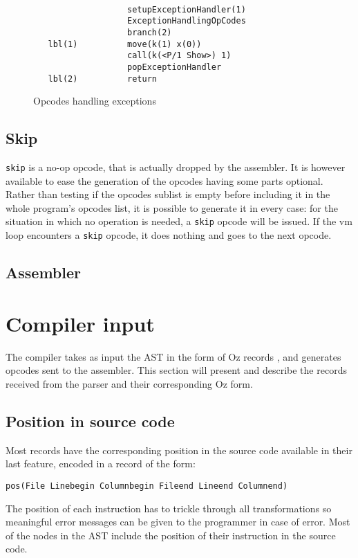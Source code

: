 \documentclass[a4paper]{memoir}
\begin{document}
\begin{figure}[ht]
\begin{lstlisting}
    
                   setupExceptionHandler(1)
                   ExceptionHandlingOpCodes
                   branch(2)
   lbl(1)          move(k(1) x(0))
                   call(k(<P/1 Show>) 1)
                   popExceptionHandler
   lbl(2)          return
\end{lstlisting}
\caption{Opcodes handling exceptions}
\label{fig:opcodes:exception:result}
\end{figure}


\subsection{Skip}
\lstinline!skip! is a no-op opcode, that is actually dropped by the assembler.
It is however available to ease the generation of the opcodes having some parts
optional. Rather than testing if the opcodes sublist is empty before including
it in the whole program's opcodes list, it is possible to generate it in every
case: for the situation in which no operation is needed, a \lstinline!skip! opcode will be
issued.
If the vm loop encounters a \lstinline!skip! opcode, it does nothing and goes to the next opcode.

\subsection{Assembler}














\section{Compiler input}\label{section:compilerinput}
The compiler takes as input the AST in the form of Oz records \cite{AST}, and generates opcodes sent to the assembler. 
This section will present and describe the records received from the parser and
their corresponding Oz form.
\subsection{Position in source code}
Most records have the corresponding position in the source code available in
their last feature, encoded in a record of the form:
\begin{lstlisting}
pos(File Linebegin Columnbegin Fileend Lineend Columnend)
\end{lstlisting}
The position of each instruction has to trickle through all transformations so meaningful error messages can be given to the programmer in case of error.
Most of the nodes in the AST include the position of their instruction in the
source code.
\end{document}
